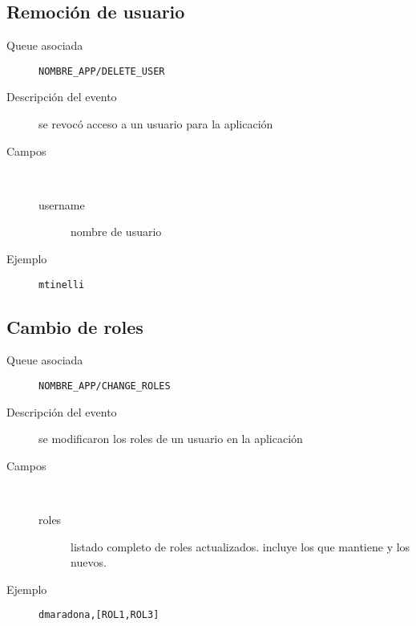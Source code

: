 \subsection{Remoción de usuario}
\begin{description}
  \item[Queue asociada] \texttt{NOMBRE\_APP/DELETE\_USER}
  \item[Descripción del evento] se revocó acceso a un usuario para la aplicación
  \item[Campos] \ 
    \begin{description}
      \item[username] nombre de usuario
    \end{description}
  \item[Ejemplo] \texttt{mtinelli}
\end{description}

\subsection{Cambio de roles}
\begin{description}
  \item[Queue asociada] \texttt{NOMBRE\_APP/CHANGE\_ROLES}
  \item[Descripción del evento] se modificaron los roles de un usuario en la aplicación
  \item[Campos] \ 
    \begin{description}
      \item[roles] listado completo de roles actualizados. incluye los que mantiene y los nuevos.
    \end{description}
  \item[Ejemplo] \texttt{dmaradona,[ROL1,ROL3]}
\end{description}
